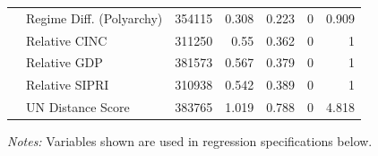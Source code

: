 \documentclass[12pt]{article}
\begin{document}
\begin{table}[htbp]
\begin{tabularx}{\textwidth}{lXrrrrr}
 & Regime Diff. (Polyarchy) & 354115 & 0.308 & 0.223 & 0 & 0.909 \\
 & Relative CINC & 311250 & 0.55 & 0.362 & 0 & 1 \\
 & Relative GDP & 381573 & 0.567 & 0.379 & 0 & 1 \\
 & Relative SIPRI & 310938 & 0.542 & 0.389 & 0 & 1 \\
 & UN Distance Score & 383765 & 1.019 & 0.788 & 0 & 4.818 \\
\bottomrule
\end{tabularx}
\begin{tablenotes}
\footnotesize
\item[] \textit{Notes:} Variables shown are used in regression specifications below.
\end{tablenotes}
\end{table}
\end{document}
